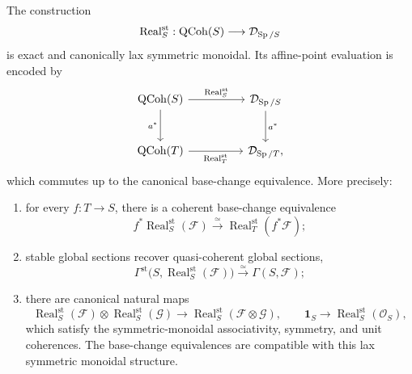 \begin{proposition}
\label{prop:stable-realization-qcoh}
The construction
\[
  \operatorname{Real}^{\mathrm{st}}_S:\operatorname{QCoh}(S)\longrightarrow\mathcal D_{\operatorname{Sp}/S}
\]
is exact and canonically lax symmetric monoidal.
Its affine-point evaluation is encoded by
\[
\begin{tikzcd}[column sep=huge,row sep=large]
  \QCoh(S)
    \arrow[r,"\operatorname{Real}^{\mathrm{st}}_S"]
    \arrow[d,"a^*"']
  &
  \mathcal D_{\Sp/S}
    \arrow[d,"a^*"]
  \\
  \QCoh(T)
    \arrow[r,"\operatorname{Real}^{\mathrm{st}}_T"']
  &
  \mathcal D_{\Sp/T} ,
\end{tikzcd}
\]
which commutes up to the canonical base-change equivalence. More precisely:
\begin{enumerate}
\item for every \(f:T\to S\), there is a coherent base-change equivalence
\[
  f^*\operatorname{Real}^{\mathrm{st}}_S(\mathcal F)
  \xrightarrow{\simeq}
  \operatorname{Real}^{\mathrm{st}}_T(f^*\mathcal F);
\]
\item stable global sections recover quasi-coherent global sections,
\[
  \Gamma^{\mathrm{st}}
  \bigl(S,\operatorname{Real}^{\mathrm{st}}_S(\mathcal F)\bigr)
  \xrightarrow{\simeq}
  \Gamma(S,\mathcal F);
\]
\item there are canonical natural maps
\[
  \operatorname{Real}^{\mathrm{st}}_S(\mathcal F)\otimes\operatorname{Real}^{\mathrm{st}}_S(\mathcal G)
  \longrightarrow
  \operatorname{Real}^{\mathrm{st}}_S(\mathcal F\otimes\mathcal G),
  \qquad
  \mathbf1_S\longrightarrow\operatorname{Real}^{\mathrm{st}}_S(\mathcal O_S),
\]
which satisfy the symmetric-monoidal associativity, symmetry, and unit coherences.
The base-change equivalences are compatible with this lax symmetric monoidal
structure.
\end{enumerate}

\end{proposition}

